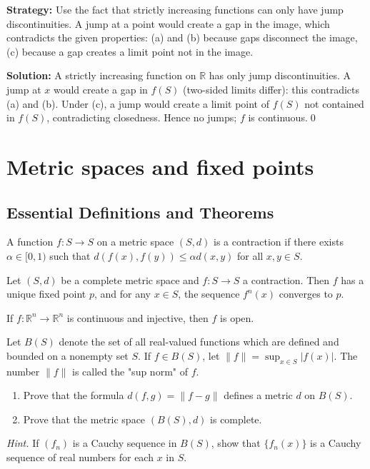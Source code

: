 \noindent\textbf{Strategy:} Use the fact that strictly increasing functions can only have jump discontinuities. A jump at a point would create a gap in the image, which contradicts the given properties: (a) and (b) because gaps disconnect the image, (c) because a gap creates a limit point not in the image.

\bigskip\noindent\textbf{Solution:}
A strictly increasing function on $\mathbb{R}$ has only jump discontinuities. A jump at $x$ would create a gap in $f(S)$ (two-sided limits differ): this contradicts (a) and (b). Under (c), a jump would create a limit point of $f(S)$ not contained in $f(S)$, contradicting closedness. Hence no jumps; $f$ is continuous.\qed

\section{Metric spaces and fixed points}

\subsection*{Essential Definitions and Theorems}

\begin{definition}
A function $f: S \to S$ on a metric space $(S,d)$ is a contraction if there exists $\alpha \in [0,1)$ such that $d(f(x), f(y)) \leq \alpha d(x,y)$ for all $x,y \in S$.
\end{definition}

\begin{theorem}
Let $(S,d)$ be a complete metric space and $f: S \to S$ a contraction. Then $f$ has a unique fixed point $p$, and for any $x \in S$, the sequence $f^n(x)$ converges to $p$.
\end{theorem}

\begin{theorem}
If $f: \mathbb{R}^n \to \mathbb{R}^n$ is continuous and injective, then $f$ is open.
\end{theorem}



\begin{problembox}
\begin{problemstatement}
Let $B(S)$ denote the set of all real-valued functions which are defined and bounded on a nonempty set $S$. If $f \in B(S)$, let $\|f\| = \sup_{x \in S} |f(x)|$. The number $\|f\|$ is called the "sup norm" of $f$.
\begin{enumerate}[label=(\alph*)]
\item Prove that the formula $d(f, g) = \|f - g\|$ defines a metric $d$ on $B(S)$.
\item Prove that the metric space $(B(S), d)$ is complete. 
\end{enumerate}
\textit{Hint.} If $(f_n)$ is a Cauchy sequence in $B(S)$, show that $\{f_n(x)\}$ is a Cauchy sequence of real numbers for each $x$ in $S$.
\end{problemstatement}
\end{problembox}

